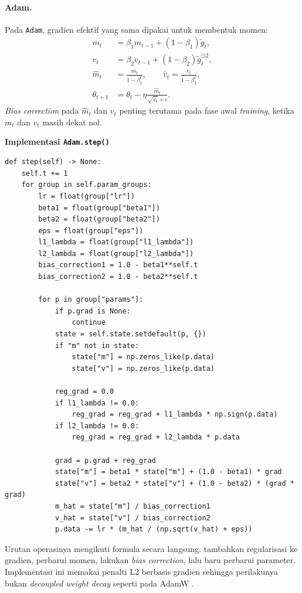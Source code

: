 \documentclass{article}
\begin{document}
\paragraph{Adam.}
Pada \texttt{Adam}, gradien efektif yang sama dipakai untuk membentuk momen:
\begin{align}
m_t &= \beta_1 m_{t-1} + (1-\beta_1)\tilde{g}_t, \\
v_t &= \beta_2 v_{t-1} + (1-\beta_2)\tilde{g}_t^{\odot 2}, \\
\hat{m}_t &= \frac{m_t}{1-\beta_1^t}, \qquad
\hat{v}_t = \frac{v_t}{1-\beta_2^t}, \\
\theta_{t+1} &= \theta_t-\eta\frac{\hat{m}_t}{\sqrt{\hat{v}_t}+\epsilon}.
\end{align}
\textit{Bias correction} pada $\hat m_t$ dan $\hat v_t$ penting terutama pada fase awal \textit{training}, ketika $m_t$ dan $v_t$ masih dekat nol.

\noindent\textbf{Implementasi \texttt{Adam.step()}}\par
\begin{lstlisting}
def step(self) -> None:
    self.t += 1
    for group in self.param_groups:
        lr = float(group["lr"])
        beta1 = float(group["beta1"])
        beta2 = float(group["beta2"])
        eps = float(group["eps"])
        l1_lambda = float(group["l1_lambda"])
        l2_lambda = float(group["l2_lambda"])
        bias_correction1 = 1.0 - beta1**self.t
        bias_correction2 = 1.0 - beta2**self.t

        for p in group["params"]:
            if p.grad is None:
                continue
            state = self.state.setdefault(p, {})
            if "m" not in state:
                state["m"] = np.zeros_like(p.data)
                state["v"] = np.zeros_like(p.data)

            reg_grad = 0.0
            if l1_lambda != 0.0:
                reg_grad = reg_grad + l1_lambda * np.sign(p.data)
            if l2_lambda != 0.0:
                reg_grad = reg_grad + l2_lambda * p.data

            grad = p.grad + reg_grad
            state["m"] = beta1 * state["m"] + (1.0 - beta1) * grad
            state["v"] = beta2 * state["v"] + (1.0 - beta2) * (grad * grad)
            m_hat = state["m"] / bias_correction1
            v_hat = state["v"] / bias_correction2
            p.data -= lr * (m_hat / (np.sqrt(v_hat) + eps))
\end{lstlisting}
Urutan operasinya mengikuti formula secara langsung: tambahkan regularisasi ke gradien, perbarui momen, lakukan \textit{bias correction}, lalu baru perbarui parameter. Implementasi ini memakai penalti L2 berbasis gradien sehingga perilakunya bukan \textit{decoupled weight decay} seperti pada AdamW \citep{kingma2015adam,loshchilov2017adamw}.
\end{document}
